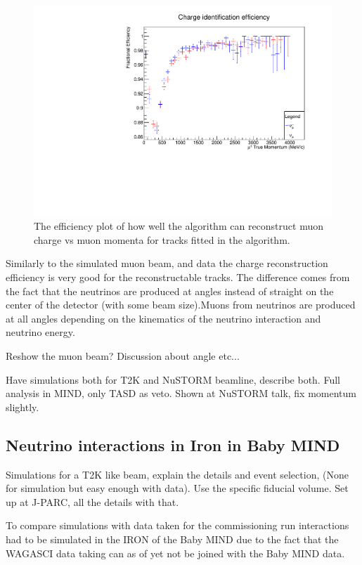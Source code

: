 \begin{figure}[h!]
\centering
\includegraphics[width=.9\textwidth]{figures/NeutrinoChap/data260618/T2K/ChargeIDT2KNeutrinoBeamMIND.pdf}
\caption{The efficiency plot of how well the algorithm can reconstruct muon charge vs muon momenta for tracks fitted in the algorithm.}
\label{fig:T2KTASDfittedcharge}
\end{figure}





Similarly to the simulated muon beam, and data the charge reconstruction efficiency is very good for the reconstructable tracks. The difference comes from the fact that the neutrinos are produced at angles instead of straight on the center of the detector (with some beam size).Muons from neutrinos are produced at all angles depending on the kinematics of the neutrino interaction and neutrino energy. 


Reshow the muon beam? Discussion about angle etc...



Have simulations both for T2K and NuSTORM beamline, describe both.
Full analysis in MIND, only TASD as veto.
 Shown at NuSTORM talk, fix momentum slightly.
 
\pagebreak
\subsection{Neutrino interactions in Iron in Baby MIND}
Simulations for a  T2K like beam, explain the details and event selection, (None for simulation but easy enough with data). Use the specific fiducial volume. Set up at J-PARC, all the details with that.

To compare simulations with data taken for the commissioning run interactions had to be simulated in the IRON of the Baby MIND due to the fact that the WAGASCI data taking can as of yet not be joined with the Baby MIND data.

